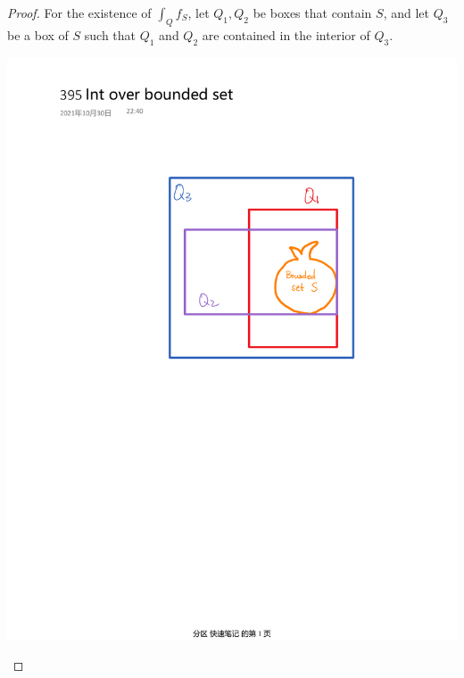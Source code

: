 \documentclass[11pt,oneside]{book}
\theoremstyle{break}
\theoremstyle{break}
\begin{document}
\begin{proof}
For the existence of $\int_Q f_S$, let $Q_1,Q_2$ be boxes that contain $S$, and let $Q_3$ be a box of $S$ such that $Q_1$ and $Q_2$ are contained in the interior of $Q_3$. 

\begin{center}
\includegraphics[scale=0.5]{IntOverBddSet.pdf}
\end{center}


\end{proof}
\end{document}
